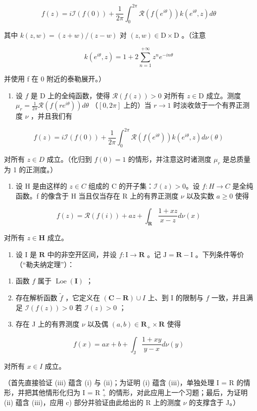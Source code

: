 \[
f (z) = i \mathcal {I} (f (0)) + \frac {1}{2 \pi} \int_ {0} ^ {2 \pi} \mathcal {R} (f (e ^ {i \theta})) k (e ^ {i \theta}, z) d \theta
\]

其中 \(k(z, w) = (z + w) / (z - w)\) 对 \((z, w) \in \mathrm{D} \times \mathrm{D}\) 。（注意

\[
k (e ^ {i \theta}, z) = 1 + 2 \sum_ {n = 1} ^ {+ \infty} z ^ {n} e ^ {- i n \theta}
\]

并使用 f 在 0 附近的泰勒展开。）

\begin{enumerate}
\def\labelenumi{\alph{enumi})}
\setcounter{enumi}{1}
\tightlist
\item
  设 \(f\) 是 D 上的全纯函数，使得 \(\mathcal{R}(f(z)) > 0\) 对所有 \(z \in \mathrm{D}\) 成立。测度 \(\mu_r = \frac{1}{2\pi} \mathcal{R}(f(re^{i\theta})) d\theta\) （\([0, 2\pi]\) 上的）当 \(r \to 1\) 时淡收敛于一个有界正测度 \(\nu\) ，并且我们有
\end{enumerate}

\[
f (z) = i \mathcal {I} (f (0)) + \frac {1}{2 \pi} \int_ {0} ^ {2 \pi} \mathcal {R} (f (e ^ {i \theta})) k (e ^ {i \theta}, z) d \nu (\theta)
\]

对所有 \(z \in D\) 成立。（化归到 \(f(0) = 1\) 的情形，并注意这时诸测度 \(\mu_{r}\) 是总质量为 1 的正测度。）

\begin{enumerate}
\def\labelenumi{\alph{enumi})}
\setcounter{enumi}{2}
\tightlist
\item
  设 H 是由这样的 \(z \in C\) 组成的 C 的开子集：\(\mathcal{I}(z) > 0\)。设 \(f: H \to C\) 是全纯函数。f 的像含于 H 当且仅当存在 R 上的有界正测度 \(\nu\) 以及实数 \(a \geqslant 0\) 使得
\end{enumerate}

\[
f (z) = \mathcal {R} (f (i)) + a z + \int_ {\mathbf {R}} \frac {1 + x z}{x - z} d \nu (x)
\]

对所有 \(z \in \mathbf{H}\) 成立。

\begin{enumerate}
\def\labelenumi{\alph{enumi})}
\setcounter{enumi}{3}
\tightlist
\item
  设 I 是 \(\mathbf{R}\) 中的非空开区间，并设 \(f\colon \mathrm{I}\to \mathbf{R}\) 。记 \(\mathrm{J} = \mathbf{R} - \mathrm{I}\) 。下列条件等价（“勒夫纳定理”）：
\end{enumerate}

\begin{enumerate}
\def\labelenumi{(\roman{enumi})}
\item
  函数 \(f\) 属于 \(\operatorname{Loe}(\mathbf{I})\) ；
\item
  存在解析函数 \(\widetilde{f}\) ，它定义在 \((\mathbf{C} - \mathbf{R}) \cup I\) 上、到 I 的限制与 \(f\) 一致，并且满足 \(\mathcal{I}(f(z)) > 0\) 若 \(\mathcal{I}(z) > 0\) ；
\item
  存在 J 上的有界测度 \(\nu\) 以及偶 \((a,b)\in\mathbf{R}_{+}\times\mathbf{R}\) 使得
\end{enumerate}

\[
f (x) = a x + b + \int_ {\mathrm{J}} \frac {1 + x y}{y - x} d \nu (y)
\]

对所有 \(x \in I\) 成立。

（首先直接验证 (iii) 蕴含 (i) 与 (ii)；为证明 (i) 蕴含 (iii)，单独处理 I = R 的情形，并把其他情形化归为 I = R \(_{+}^{*}\) 的情形，对此应用上一个习题；最后，为证明 (ii) 蕴含 (iii)，应用 c) 部分并验证由此给出的 R 上的测度 \(\nu\) 的支撑含于 J。）

